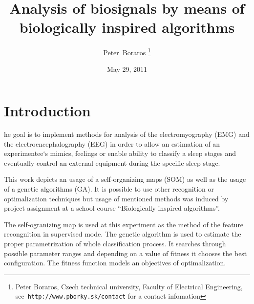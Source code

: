 \documentclass[a4paper]{IEEEtran}
\begin{document}
\title{Analysis of biosignals by means of\\ biologically inspired algorithms}
\date{May 29, 2011}
\author{Peter~Boraros %
\thanks{{Peter Boraros}, Czech technical university, Faculty of Electrical Engineering,
see~\texttt{http://www.pborky.sk/contact} for a contact infomation}}%



\maketitle
\IEEEdisplaynotcompsoctitleabstractindextext
\IEEEpeerreviewmaketitle


\section{Introduction}
he goal is to implement methods for analysis of
the electromyography (EMG) and the electroencephalography (EEG)
in order to allow an estimation of an experimentee`s mimics, 
feelings or enable ability to classify a sleep stages and eventually control 
an external equipment during the specific sleep stage.

This work depicts an usage of a self-organizing maps (SOM) as well as the usage of a genetic
algorithms (GA). It is possible to use other recognition or optimalization
techniques but usage of mentioned 
methods was induced by project assignment at a school course ``Biologically inspired 
algorithms''.

The self-ogranizing map is used  at this experiment as the method of the feature
recongnition in 
supervised mode. The genetic algorithm is used to estimate the proper parametrization of 
whole classification process. It searches through possible parameter ranges and 
depending on a value of fitness it chooses the best configuration. The fitness function
models an objectives of optimalization.
\end{document}
